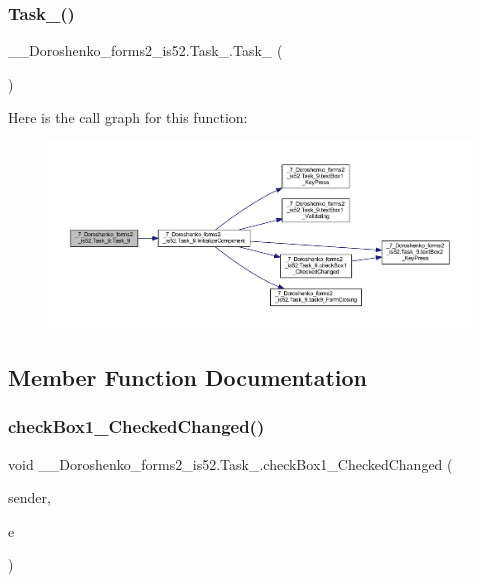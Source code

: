 \subsubsection{\texorpdfstring{Task\+\_()}{Task\_9()}}
{\footnotesize\ttfamily \+\_\+\_\+\+Doroshenko\+\_\+forms2\+\_\+is52.\+Task\+\_.\+Task\+\_ (\begin{DoxyParamCaption}{ }\end{DoxyParamCaption})}

Here is the call graph for this function\+:
\nopagebreak
\begin{figure}[H]
\begin{center}
\leavevmode
\includegraphics[width=350pt]{class__7___doroshenko__forms2__is52_1_1_task__9_a678e24f395e1a9fbf761bca24eaf39cf_cgraph}
\end{center}
\end{figure}


\subsection{Member Function Documentation}
\hypertarget{class__7___doroshenko__forms2__is52_1_1_task__9_a0ff0bb8624f4a84309bfdfd506377c16}{}\label{class__7___doroshenko__forms2__is52_1_1_task__9_a0ff0bb8624f4a84309bfdfd506377c16} 
\subsubsection{\texorpdfstring{check\+Box1\+\_\+\+Checked\+Changed()}{checkBox1\_CheckedChanged()}}
{\footnotesize\ttfamily void \+\_\+\_\+\+Doroshenko\+\_\+forms2\+\_\+is52.\+Task\+\_.\+check\+Box1\+\_\+\+Checked\+Changed (\begin{DoxyParamCaption}\item[{object}]{sender,  }\item[{Event\+Args}]{e }\end{DoxyParamCaption})\hspace{0.3cm}{\ttfamily [private]}}

